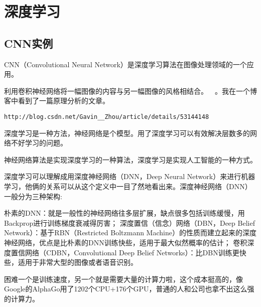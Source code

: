 \chapter{深度学习\cite{Lecun2015Deeplearning}}
\section{CNN实例}
CNN（Convolutional Neural Network）是深度学习算法在图像处理领域的一个应用。

利用卷积神经网络将一幅图像的内容与另一幅图像的风格相结合。~\cite{Johnson2015}~\cite{Gatys2016Image}。我在一个博客中看到了一篇原理分析的文章。



\verb|http://blog.csdn.net/Gavin__Zhou/article/details/53144148|

深度学习是一种方法，神经网络是个模型。用了深度学习可以有效解决层数多的网络不好学习的问题。

神经网络算法是实现深度学习的一种算法，深度学习是实现人工智能的一种方式。

深度学习可以理解成用深度神经网络（DNN，Deep Neural Network）来进行机器学习，他俩的关系可以从这个定义中一目了然地看出来。深度神经网络（DNN）一般分为三种架构:
    
朴素的DNN：就是一般性的神经网络往多层扩展，缺点很多包括训练缓慢，用Backprop进行训练梯度衰减得厉害；
深度置信（信念）网络（DBN，Deep Belief Network）：基于RBN（Restricted Boltzmann Machine）的性质而建立起来的深度神经网络，优点是比朴素的DNN训练快些，适用于最大似然概率的估计；
卷积深度置信网络（CDBN，Convolutional Deep Belief Networks）：比DBN训练更快些，适用于非常大型的图像或者语音识别。
    
困难一个是训练速度，另一个就是需要大量的计算力啦，这个成本挺高的，像Google的AlphaGo用了1202个CPU+176个GPU，普通的人和公司也拿不出这么强的计算力。